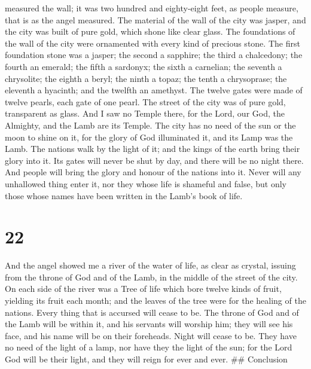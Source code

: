 measured the wall; it was two hundred and eighty-eight feet, as people
measure, that is as the angel measured.  The material of
the wall of the city was jasper, and the city was built of pure gold,
which shone like clear glass.  The foundations of the wall
of the city were ornamented with every kind of precious stone. The first
foundation stone was a jasper; the second a sapphire; the third a
chalcedony; the fourth an emerald;  the fifth a sardonyx;
the sixth a carnelian; the seventh a chrysolite; the eighth a beryl; the
ninth a topaz; the tenth a chrysoprase; the eleventh a hyacinth; and the
twelfth an amethyst.  The twelve gates were made of twelve
pearls, each gate of one pearl. The street of the city was of pure gold,
transparent as glass.  And I saw no Temple there, for the
Lord, our God, the Almighty, and the Lamb are its Temple. 
The city has no need of the sun or the moon to shine on it, for the
glory of God illuminated it, and its Lamp was the Lamb. 
The nations walk by the light of it; and the kings of the earth bring
their glory into it.  Its gates will never be shut by day,
and there will be no night there.  And people will bring
the glory and honour of the nations into it.  Never will
any unhallowed thing enter it, nor they whose life is shameful and
false, but only those whose names have been written in the Lamb's book
of life.

\hypertarget{section-21}{%
\section{22}\label{section-21}}

 And the angel showed me a river of the water of life, as
clear as crystal, issuing from the throne of God and of the Lamb,
 in the middle of the street of the city. On each side of
the river was a Tree of life which bore twelve kinds of fruit, yielding
its fruit each month; and the leaves of the tree were for the healing of
the nations.  Every thing that is accursed will cease to be.
The throne of God and of the Lamb will be within it, and his servants
will worship him;  they will see his face, and his name will
be on their foreheads.  Night will cease to be. They have no
need of the light of a lamp, nor have they the light of the sun; for the
Lord God will be their light, and they will reign for ever and ever.
\#\# Conclusion

